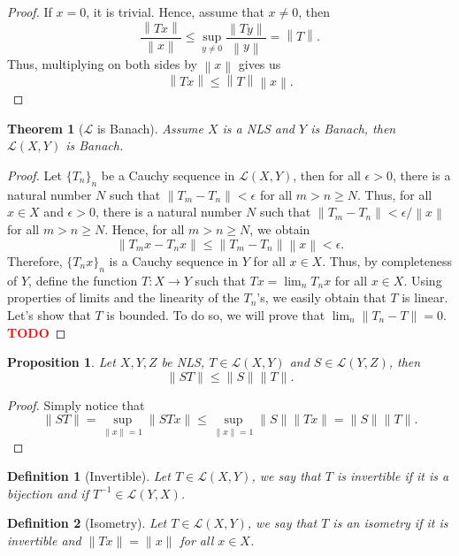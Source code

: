 \documentclass{article}
\newtheorem*{theorem}{Theorem}
\newtheorem*{proposition}{Proposition}
\newtheorem*{definition}{Definition}
\renewcommand{\L}{\mathcal{L}}
\newcommand{\norm}[1]{\left\lVert#1 \right\rVert}
\newcommand{\td}{\textcolor{red}{\textbf{TODO}}}
\begin{document}
\begin{proof}
    If $x = 0$, it is trivial. Hence, assume that $x \neq 0$, then
    $$\frac{\norm{Tx}}{\norm{x}} \leq \sup_{y \neq 0}\frac{\norm{Ty}}{\norm{y}} = \norm{T}.$$
    Thus, multiplying on both sides by $\norm{x}$ gives us
    $$\norm{Tx} \leq \norm{T}\norm{x}.$$
\end{proof}

\begin{theorem}[$\L$ is Banach]
    Assume $X$ is a NLS and $Y$ is Banach, then $\L(X,Y)$ is Banach. 
\end{theorem}

\begin{proof}
    Let $\{T_n\}_n$ be a Cauchy sequence in $\L(X,Y)$, then for all $\epsilon > 0$, there is a natural number $N$ such that $\norm{T_m - T_n} < \epsilon$ for all $m > n \geq N$. Thus, for all $x \in X$ and $\epsilon > 0$, there is a natural number $N$ such that $\norm{T_m - T_n} < \epsilon/\norm{x}$ for all $m > n \geq N$. Hence, for all $m > n \geq N$, we obtain
    $$\norm{T_m x - T_n x} \leq \norm{T_m - T_n} \norm{x} < \epsilon.$$
    Therefore, $\{T_nx\}_n$ is a Cauchy sequence in $Y$ for all $x \in X$. Thus, by completeness of $Y$, define the function $T : X \to Y$ such that $Tx = \lim_n T_n x$ for all $x \in X$. Using properties of limits and the linearity of the $T_n$'s, we easily obtain that $T$ is linear. \\
    Let's show that $T$ is bounded. To do so, we will prove that $\lim_n \|T_n - T\| = 0$. \td 
\end{proof}

\begin{proposition}
    Let $X,Y,Z$ be NLS, $T \in \L(X,Y)$ and $S \in \L(Y,Z)$, then $$\|ST\| \leq \|S\|\|T\|.$$
\end{proposition}

\begin{proof}
    Simply notice that 
    $$\|ST\| = \sup_{\|x\| = 1}\|STx\| \leq \sup_{\|x\| = 1}\|S\|\|Tx\| = \|S\| \|T\|.$$
\end{proof}

\begin{definition}[Invertible]
    Let $T \in \L(X,Y)$, we say that $T$ is invertible if it is a bijection and if $T^{-1} \in \L(Y,X)$.
\end{definition}

\begin{definition}[Isometry]
    Let $T \in \L(X,Y)$, we say that $T$ is an isometry if it is invertible and $\|Tx\| = \|x\|$ for all $x \in X$.
\end{definition}
\end{document}
